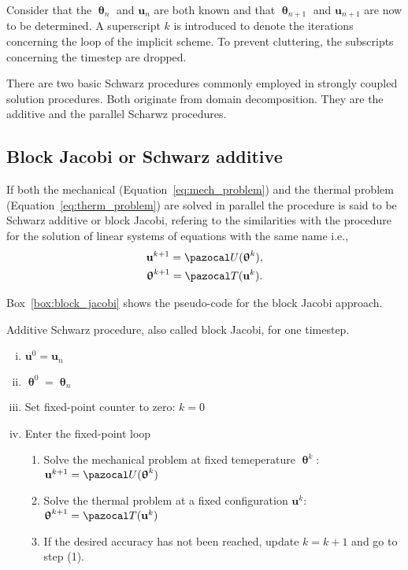Consider that the $\bm \uptheta_n$ and $\mathbf u_n$ are both known and that $\bm \uptheta_{n+1}$ and $\mathbf u_{n+1}$ are now to be determined.
A superscript $k$ is introduced to denote the iterations concerning the loop of the implicit scheme.
To prevent cluttering, the subscripts concerning the timestep are dropped.


There are two basic Schwarz procedures commonly employed in strongly coupled solution procedures. Both originate from domain decomposition.
They are the additive and the parallel Scharwz procedures.

\subsection{Block Jacobi or Schwarz additive}

If both the mechanical (Equation~\eqref{eq:mech_problem}) and the thermal problem (Equation~\eqref{eq:therm_problem}) are solved in parallel the procedure is said to be Schwarz additive or block Jacobi, refering to the similarities with the procedure for the solution of linear systems of equations with the same name i.e.,
\begin{gather}
\mathbf u^{k+1} = \pazocal U(\bm \uptheta^k),\\
\bm \uptheta^{k+1} = \pazocal T(\mathbf u^k).
\end{gather}

Box~\ref{box:block_jacobi} shows the pseudo-code for the block Jacobi approach.

\begin{framedbox}[htb]
  \caption{Additive Schwarz procedure, also called block Jacobi, for one timestep.}
  \label{box:block_jacobi}
  \begin{center}
    \begin{minipage}{0.9\textwidth}
    \begin{enumerate}[(i)]
    \item \(\mathbf u^0 = \mathbf u_{n}\)
    \item \(\bm \uptheta^0 = \bm \uptheta_n\)
    \item Set fixed-point counter to zero: \(k=0\)
    \item Enter the fixed-point loop
    \begin{enumerate}[(1)]
      \item Solve the mechanical problem at fixed temeperature \(\bm \uptheta^k\): \(\mathbf u^{k+1} = \pazocal U(\bm \uptheta^k)\)
      \item Solve the thermal problem at a fixed configuration \(\mathbf u^k\): \(\bm \uptheta^{k+1} = \pazocal T(\mathbf u^k)\)
      \item If the desired accuracy has not been reached, update \(k=k+1\) and go to step (1).

    \end{enumerate}
    \end{enumerate}
    \end{minipage}
  \end{center}
\end{framedbox}

